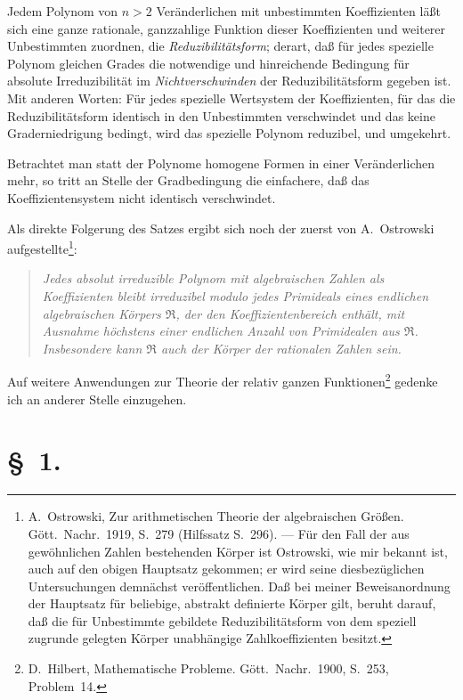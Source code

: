 \documentclass[fontsize=10pt,paper=a5,pagesize,headings=small]{scrbook}
\newcommand{\ring}[1]{\mathfrak{#1}}
\theoremstyle{plain}
\begin{document}
Jedem Polynom von $n > 2$ Veränderlichen mit unbestimmten Koeffizienten läßt
sich eine ganze rationale, ganzzahlige Funktion dieser Koeffizienten und weiterer
Unbestimmten zuordnen, die \textit{Reduzibilitätsform}; derart, daß für jedes spezielle
Polynom gleichen Grades die notwendige und hinreichende Bedingung für absolute
Irreduzibilität im \textit{Nichtverschwinden} der Reduzibilitätsform gegeben ist.
Mit anderen Worten: Für jedes spezielle Wertsystem der Koeffizienten, für das
die Reduzibilitätsform identisch in den Unbestimmten verschwindet und das keine
Graderniedrigung bedingt, wird das spezielle Polynom reduzibel, und umgekehrt.

Betrachtet man statt der Polynome homogene Formen in einer Veränderlichen
mehr, so tritt an Stelle der Gradbedingung die einfachere, daß das Koeffizientensystem
nicht identisch verschwindet.

Als direkte Folgerung des Satzes ergibt sich noch der zuerst von
A.~Ostrowski aufgestellte\footnote{A.~Ostrowski, Zur arithmetischen Theorie der
algebraischen Größen. Gött.\ Nachr.\ 1919, S.~279 (Hilfssatz S.~296). --- Für den Fall
der aus gewöhnlichen Zahlen bestehenden Körper ist Ostrowski, wie mir bekannt ist,
auch auf den obigen Hauptsatz gekommen; er wird seine diesbezüglichen Untersuchungen
demnächst veröffentlichen. Daß bei meiner Beweisanordnung der Hauptsatz für
beliebige, abstrakt definierte Körper gilt, beruht darauf, daß die für Unbestimmte
gebildete Reduzibilitätsform von dem speziell zugrunde gelegten Körper unabhängige
Zahlkoeffizienten besitzt.}:

\begin{quote}
\textit{Jedes absolut irreduzible Polynom mit algebraischen Zahlen als Koeffizienten
bleibt irreduzibel modulo jedes Primideals eines endlichen algebraischen Körpers
$\ring{R}$, der den Koeffizientenbereich enthält, mit Ausnahme höchstens einer endlichen
Anzahl von Primidealen aus $\ring{R}$. Insbesondere kann $\ring{R}$ auch der Körper der
rationalen Zahlen sein.}
\end{quote}

Auf weitere Anwendungen zur Theorie der relativ ganzen Funktionen\footnote{D.~Hilbert,
Mathematische Probleme. Gött.\ Nachr.\ 1900, S.~253, Problem~14.}
gedenke ich an anderer Stelle einzugehen.

\section*{\S~1.}
\setcounter{section}{1}
\end{document}
